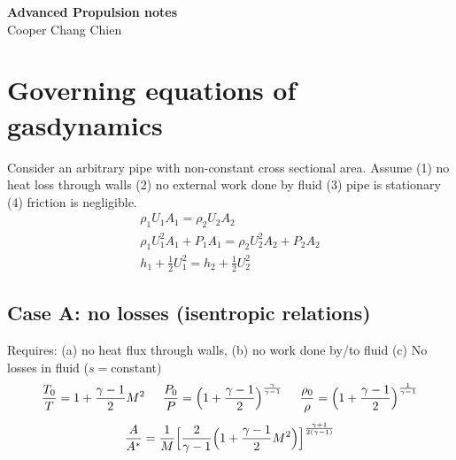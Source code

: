 \documentclass[a4paper,10pt]{article}
\begin{document}
\begin{center}
    {\textbf{\Large{Advanced Propulsion notes}}}\\[0.2cm]
    {\large{Cooper Chang Chien}}
\end{center}

\tableofcontents
\newpage


\section{Governing equations of gasdynamics}
Consider an arbitrary pipe with non-constant cross sectional area. Assume (1) no heat loss through walls (2) no external work done by fluid (3) pipe is stationary (4) friction is negligible. 
\begin{gather*}
    \rho_1U_1A_1 = \rho_2U_2A_2\\
    \rho_1U_1^2A_1+P_1A_1=\rho_2U_2^2A_2+P_2A_2\\
    h_1+\frac{1}{2}U_1^2=h_2+\frac{1}{2}U_2^2
\end{gather*}

\subsection{Case A: no losses (isentropic relations)}
Requires: (a) no heat flux through walls, (b) no work done by/to fluid (c) No losses in fluid ($s=$constant)
\begin{gather*}
    \frac{T_0}{T}=1+\frac{\gamma-1}{2}M^2\hspace*{0.5cm}\frac{P_0}{P}=\Big(1+\frac{\gamma-1}{2}\Big)^{\frac{\gamma}{\gamma-1}}\hspace*{0.5cm}\frac{\rho_0}{\rho} = \Big(1+\frac{\gamma-1}{2}\Big)^{\frac{1}{\gamma-1}}\\[0.15cm]
    \frac{A}{A^*}=\frac{1}{M}\Big[\frac{2}{\gamma-1}\Big(1+\frac{\gamma-1}{2}M^2\Big)\Big]^{\frac{\gamma+1}{2(\gamma-1)}}
\end{gather*}
\end{document}
